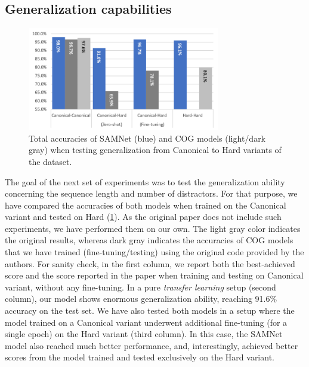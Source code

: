 \subsection{Generalization capabilities}

\begin{figure}[!b]
	\centering
	\includegraphics[width=0.75\textwidth]{../results/samnet_cog_overall_transfer.png}
	\caption{Total accuracies of SAMNet (blue) and COG models (light/dark gray) when testing generalization from Canonical to Hard variants of the dataset.}
	\label{fig:samnet_cog_overall_transfer}
\end{figure}

The goal of the next set of experiments was to test the generalization ability concerning the sequence length and number of distractors.
For that purpose, we have compared the accuracies of both models when trained on the Canonical variant and tested on Hard (\cref{fig:samnet_cog_overall_transfer}).
As the original paper does not include such experiments, we have performed them on our own.  The light gray color indicates the original results, whereas dark gray indicates the accuracies of COG models that we have trained (fine-tuning/testing) using the original code provided by the authors.
For sanity check, in the first column, we report both the best-achieved score and the score reported in the paper when training and testing on Canonical variant, without any fine-tuning.
In a pure \textit{transfer learning} setup (second column), our model shows enormous generalization ability, reaching 91.6\% accuracy on the test set.
We have also tested both models in a setup where the model trained on a Canonical variant underwent additional fine-tuning (for a single epoch) on the Hard variant (third column).
In this case, the SAMNet model also reached much better performance, and, interestingly, achieved better scores from the model trained and tested exclusively on the Hard variant.

